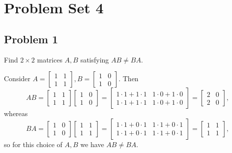 \documentclass[main.tex]{subfiles}
\begin{document}
\section{Problem Set 4}

\subsection{Problem 1}
\begin{claim}
    Find $2 \times 2$ matrices $A, B$ satisfying $AB \neq BA$.
\end{claim}

\begin{soln}
Consider $A = \begin{bmatrix} 1 & 1 \\ 1 & 1\end{bmatrix}, B = \begin{bmatrix}
    1 & 0 \\
    1 & 0
\end{bmatrix}$. Then
\[AB = \begin{bmatrix} 1 & 1 \\ 1 & 1\end{bmatrix} \begin{bmatrix}
    1 & 0 \\
    1 & 0
\end{bmatrix} = \begin{bmatrix}
    1\cdot 1 + 1\cdot 1 & 1\cdot 0 + 1\cdot 0 \\
    1\cdot 1 + 1\cdot 1 & 1\cdot 0 + 1\cdot 0
\end{bmatrix} = \begin{bmatrix}
    2 & 0 \\
    2 & 0
\end{bmatrix},\]
whereas
\[BA = \begin{bmatrix} 1 & 0 \\ 1 & 0\end{bmatrix} \begin{bmatrix}
    1 & 1 \\
    1 & 1
\end{bmatrix} = \begin{bmatrix}
    1\cdot 1 + 0\cdot 1 & 1\cdot 1 + 0\cdot 1 \\
    1\cdot 1 + 0\cdot 1 & 1\cdot 1 + 0\cdot 1
\end{bmatrix} = \begin{bmatrix}
    1 & 1 \\
    1 & 1
\end{bmatrix},\]
so for this choice of $A, B$ we have $AB\neq BA$.
\end{soln}
\eject
\end{document}
